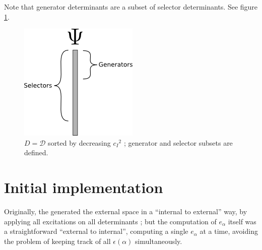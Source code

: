 \documentclass[./thesis.tex]{subfiles}
\begin{document}
Note that generator determinants are a subset of selector determinants. See figure \ref{fig:generators_selectors}.


\begin{figure}[h!]
        
        \begin{center}
                \includegraphics[width=0.25\columnwidth]{figures/cipsi/selexemple2}
        \end{center}
        \caption{$D = \mathcal{D}$ sorted by decreasing ${c_I}^2$ ; generator and selector subsets are defined.}
        \label{fig:generators_selectors}
\end{figure}



\section{Initial implementation}

Originally, the \QP generated the external space in a ``internal to external'' way, by applying all excitations on all determinants ; but the computation of $e_\alpha$ itself was a straightforward ``external to internal'', computing a single $e_\alpha$ at a time, avoiding the problem of keeping track of all $\epsilon(\alpha)$ simultaneously.
\end{document}
